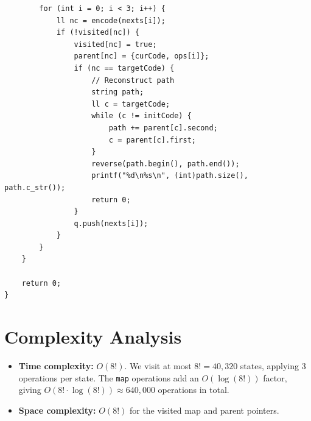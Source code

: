 \documentclass[11pt,a4paper]{article}
\begin{document}
\begin{lstlisting}
        for (int i = 0; i < 3; i++) {
            ll nc = encode(nexts[i]);
            if (!visited[nc]) {
                visited[nc] = true;
                parent[nc] = {curCode, ops[i]};
                if (nc == targetCode) {
                    // Reconstruct path
                    string path;
                    ll c = targetCode;
                    while (c != initCode) {
                        path += parent[c].second;
                        c = parent[c].first;
                    }
                    reverse(path.begin(), path.end());
                    printf("%d\n%s\n", (int)path.size(), path.c_str());
                    return 0;
                }
                q.push(nexts[i]);
            }
        }
    }

    return 0;
}
\end{lstlisting}

\section{Complexity Analysis}

\begin{itemize}
  \item \textbf{Time complexity:} $O(8!)$. We visit at most $8! = 40{,}320$ states,
        applying 3 operations per state. The \texttt{map} operations add an $O(\log(8!))$
        factor, giving $O(8! \cdot \log(8!)) \approx 640{,}000$ operations in total.
  \item \textbf{Space complexity:} $O(8!)$ for the visited map and parent pointers.
\end{itemize}
\end{document}
